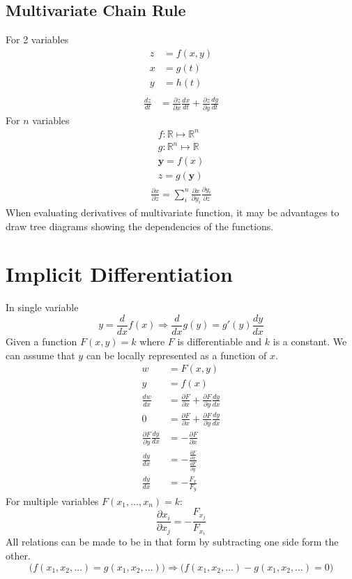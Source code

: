 \documentclass{article}
\theoremstyle{mytheoremstyle}
\theoremstyle{mytheoremstyle}
\theoremstyle{myproblemstyle}
\begin{document}
    \subsection*{Multivariate Chain Rule}
    For 2 variables
    \begin{align*}
        z &= f(x,y) \\
        x &= g(t) \\
        y &= h(t) \\
    \end{align*}
    \begin{align*}
        \frac{dz}{dt} &= \frac{\partial z}{\partial x} \frac{dx}{dt}
        + \frac{\partial z}{\partial y} \frac{dy}{dt}
    \end{align*}
    For $n$ variables
    \begin{align*}
        f: \mathbb{R} \mapsto \mathbb{R}^n \\
        g: \mathbb{R}^n \mapsto \mathbb{R} \\
        \mathbf{y} = f(x) \\
        z = g(\mathbf{y})
    \end{align*}
    \begin{align*}
        \frac{\partial x}{\partial z} = \sum_i^n \frac{\partial x}{\partial y_i} \frac{\partial y_i}{\partial z}
    \end{align*}
    When evaluating derivatives of multivariate function, it may be advantages
    to draw tree diagrams showing the dependencies of the functions.

    \section*{Implicit Differentiation}
    In single variable
    \[
        y = \frac{d}{dx} f(x) \Rightarrow \frac{d}{dx} g(y) = g'(y) \frac{dy}{dx}
    \]
    Given a function $F(x,y)=k$ where $F$ is differentiable and $k$ is a
    constant. We can assume that $y$ can be locally represented as a function of
    $x$.
    \begin{align*}
        w &= F(x,y) \\
        y &= f(x) \\
        \frac{dw}{dx} &= \frac{\partial F}{\partial x} + \frac{\partial F}{\partial y} \frac{dy}{dx} \\
        0 &= \frac{\partial F}{\partial x} + \frac{\partial F}{\partial y} \frac{dy}{dx} \\
        \frac{\partial F}{\partial y} \frac{dy}{dx} &= - \frac{\partial F}{\partial x}  \\
        \frac{dy}{dx} &= - \frac{\frac{\partial F}{\partial x}}{\frac{\partial F}{\partial y}} \\
        \frac{dy}{dx} &= -\frac{F_x}{F_y}
    \end{align*}
    For multiple variables $F(x_1,\dots,x_n) = k$:
    \[
        \frac{\partial x_i}{\partial x_j} = -\frac{F_{x_j}}{F_{x_i}}
    \]
    All relations can be made to be in that form by subtracting one side form
    the other.
    \[
        \Big(f(x_1,x_2,\dots)=g(x_1,x_2,\dots)\Big) \Rightarrow \Big(f(x_1,x_2,\dots)-g(x_1,x_2,\dots) = 0\Big)
    \]
\end{document}

